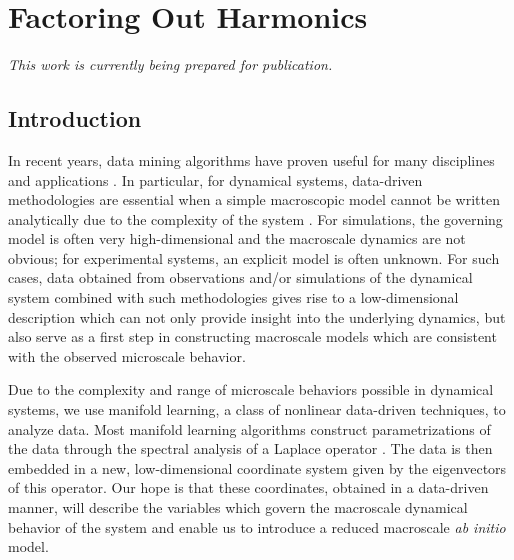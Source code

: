 
\chapter{Factoring Out Harmonics\label{ch:harmonics}}

\graphicspath{{ch-harmonics/figures/}}

{\em This work is currently being prepared for publication.}

\section{Introduction}

In recent years, data mining algorithms have proven useful for many disciplines and applications \cite{gepshtein2013image, fernandez2014diffusion, singer2011viewing, yuan2014automated, zhao2003face, trapnell2014dynamics, kemelmacher2011exploring, sifre2013rotation}.
%
In particular, for dynamical systems, data-driven methodologies are essential when a simple macroscopic model cannot be written analytically due to the complexity of the system \cite{talmon2014intrinsic,berry2013time,singer2009detecting,ferguson2010systematic}.
%
For simulations, the governing model is often very high-dimensional and the macroscale dynamics are not obvious; for experimental systems, an explicit model is often unknown.
%
For such cases, data obtained from observations and/or simulations of the dynamical system combined with such methodologies gives rise to a low-dimensional description which can not only provide insight into the underlying dynamics, but also serve as a first step in constructing macroscale models which are consistent with the observed microscale behavior.

Due to the complexity and range of microscale behaviors possible in dynamical systems, we use manifold learning, a class of nonlinear data-driven techniques, to analyze data.
%
Most manifold learning algorithms construct parametrizations of the data through the spectral analysis of a Laplace operator \cite{Belkin2003,coifman2005geometric,coifman2006geometric,singer2008non}.
%
The data is then embedded in a new, low-dimensional coordinate system given by the eigenvectors of this operator.
%
Our hope is that these coordinates, obtained in a data-driven manner, will describe the variables which govern the macroscale dynamical behavior of the system and enable us to introduce a reduced macroscale {\em ab initio} model.

